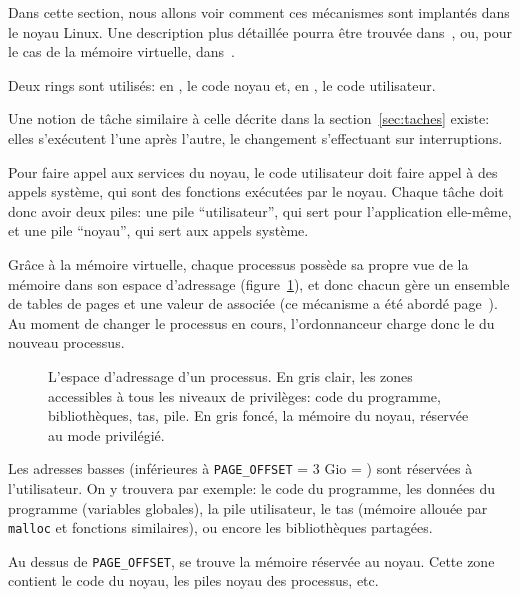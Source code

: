 Dans cette section, nous allons voir comment ces mécanismes sont implantés dans
le noyau Linux. Une description plus détaillée pourra être trouvée
dans~\cite{UnderstandingTheLinuxKernel}, ou, pour le cas de la mémoire
virtuelle, dans~\cite{LinuxVMM}.

Deux rings sont utilisés: en , le code noyau et, en , le code
utilisateur.

Une notion de tâche similaire à celle décrite dans la section~\ref{sec:taches}
existe: elles s'exécutent l'une après l'autre, le changement s'effectuant sur
interruptions.

Pour faire appel aux services du noyau, le code utilisateur doit faire appel à
des appels système, qui sont des fonctions exécutées par le noyau. Chaque tâche
doit donc avoir deux piles: une pile \enquote{utilisateur}, qui sert pour
l'application elle-même, et une pile \enquote{noyau}, qui sert aux appels
système.

Grâce à la mémoire virtuelle, chaque processus possède sa propre vue de la
mémoire dans son espace d'adressage (figure~\ref{fig:memmap}), et donc chacun
gère un ensemble de tables de pages et une valeur de \crtrois{} associée (ce
mécanisme a été abordé page~\pageref{page:mem-virt}). Au moment de changer le
processus en cours, l'ordonnanceur charge donc le \crtrois{} du nouveau
processus.

\begin{figure}[b] %
\centering


\caption[Espace d'adressage d'un processus]{L'espace d'adressage d'un processus.
En gris clair, les zones accessibles à tous les niveaux de privilèges: code du
programme, bibliothèques, tas, pile. En gris foncé, la mémoire du noyau,
réservée au mode privilégié.}

\label{fig:memmap}
\end{figure}

Les adresses basses (inférieures à \texttt{PAGE\_OFFSET} = 3 Gio =
) sont réservées à l'utilisateur. On y trouvera par exemple:
le code du programme,
les données du programme (variables globales),
la pile utilisateur,
le tas (mémoire allouée par \texttt{malloc} et fonctions similaires), ou encore
les bibliothèques partagées.


Au dessus de \texttt{PAGE\_OFFSET}, se trouve la mémoire réservée au noyau.
Cette zone contient le code du noyau, les piles noyau des processus, etc.

